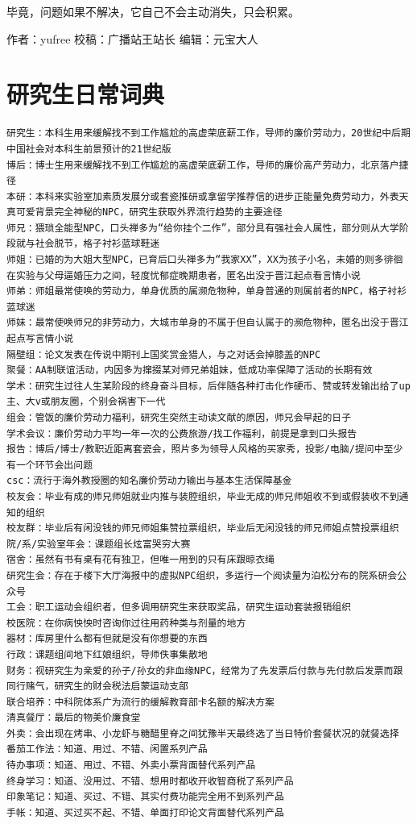 \documentclass[]{book}
\begin{document}
毕竟，问题如果不解决，它自己不会主动消失，只会积累。

作者：yufree
校稿：广播站王站长
编辑：元宝大人

\hypertarget{ux7814ux7a76ux751fux65e5ux5e38ux8bcdux5178}{%
\section{研究生日常词典}\label{ux7814ux7a76ux751fux65e5ux5e38ux8bcdux5178}}

\begin{verbatim}
研究生：本科生用来缓解找不到工作尴尬的高虚荣底薪工作，导师的廉价劳动力，20世纪中后期中国社会对本科生前景预计的21世纪版
博后：博士生用来缓解找不到工作尴尬的高虚荣底薪工作，导师的廉价高产劳动力，北京落户捷径
本研：本科来实验室加素质发展分或套瓷推研或拿留学推荐信的进步正能量免费劳动力，外表天真可爱背景完全神秘的NPC，研究生获取外界流行趋势的主要途径
师兄：猥琐全能型NPC，口头禅多为“给你挂个二作”，部分具有强社会人属性，部分则从大学阶段就与社会脱节，格子衬衫蓝球鞋迷
师姐：已婚的为大姐大型NPC，已育后口头禅多为“我家XX”，XX为孩子小名，未婚的则多徘徊在实验与父母逼婚压力之间，轻度忧郁症晚期患者，匿名出没于晋江起点看言情小说
师弟：师姐最常使唤的劳动力，单身优质的属濒危物种，单身普通的则属前者的NPC，格子衬衫蓝球迷
师妹：最常使唤师兄的非劳动力，大城市单身的不属于但自认属于的濒危物种，匿名出没于晋江起点写言情小说
隔壁组：论文发表在传说中期刊上国奖赏金猎人，与之对话会掉膝盖的NPC
聚餐：AA制联谊活动，内因多为撺掇某对师兄弟姐妹，低成功率保障了活动的长期有效
学术：研究生过往人生某阶段的终身奋斗目标，后伴随各种打击化作硬币、赞或转发输出给了up主、大v或朋友圈，个别会祸害下一代
组会：管饭的廉价劳动力福利，研究生突然主动读文献的原因，师兄会早起的日子
学术会议：廉价劳动力平均一年一次的公费旅游/找工作福利，前提是拿到口头报告
报告：博后/博士/教职近距离套瓷会，照片多为领导人风格的买家秀，投影/电脑/提问中至少有一个环节会出问题
csc：流行于海外教授圈的知名廉价劳动力输出与基本生活保障基金
校友会：毕业有成的师兄师姐就业内推与装腔组织，毕业无成的师兄师姐收不到或假装收不到通知的组织
校友群：毕业后有闲没钱的师兄师姐集赞拉票组织，毕业后无闲没钱的师兄师姐点赞投票组织
院/系/实验室年会：课题组长炫富哭穷大赛
宿舍：虽然有书有桌有花有独卫，但唯一用到的只有床跟晾衣绳
研究生会：存在于楼下大厅海报中的虚拟NPC组织，多运行一个阅读量为泊松分布的院系研会公众号
工会：职工运动会组织者，但多调用研究生来获取奖品，研究生运动套装报销组织
校医院：在你病怏怏时咨询你过往用药种类与剂量的地方
器材：库房里什么都有但就是没有你想要的东西
行政：课题组间地下红娘组织，导师佚事集散地
财务：视研究生为亲爱的孙子/孙女的非血缘NPC，经常为了先发票后付款与先付款后发票而跟同行赌气，研究生的财会税法启蒙运动支部
联合培养：中科院体系广为流行的缓解教育部卡名额的解决方案
清真餐厅：最后的物美价廉食堂
外卖：会出现在烤串、小龙虾与糖醋里脊之间犹豫半天最终选了当日特价套餐状况的就餐选择
番茄工作法：知道、用过、不错、闲置系列产品
待办事项：知道、用过、不错、外卖小票背面替代系列产品
终身学习：知道、没用过、不错、想用时都收开收智商税了系列产品
印象笔记：知道、买过、不错、其实付费功能完全用不到系列产品
手帐：知道、买过买不起、不错、单面打印论文背面替代系列产品


\end{verbatim}
\end{document}
